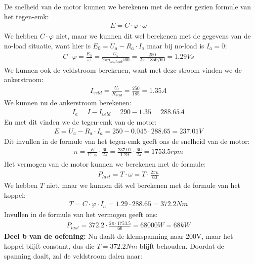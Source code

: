 \begin{oefenblok}
De snelheid van de motor kunnen we berekenen met de eerder gezien formule van het
tegen-emk:
\begin{align*}
    E = C \cdot \varphi \cdot \omega
\end{align*}
We hebben $C \cdot \varphi$ niet, maar we kunnen dit wel berekenen met de gegevens van de
no-load situatie, want hier is $E_0 = U_a - R_a \cdot I_a$ maar bij no-load is $I_a = 0$:
\begin{align*}
    C \cdot \varphi = \frac{E_0}{\omega} = \frac{U_a}{2 \pi n_{no,load}/60} = \frac{250}{2 \pi \cdot 1850/60} = 1.29 Vs
\end{align*}
We kunnen ook de veldstroom berekenen, want met deze stroom vinden we de ankerstroom:
\begin{align*}
    I_{veld} = \frac{U_a}{R_{veld}} = \frac{250}{185} = 1.35 A
\end{align*}
We kunnen nu de ankerstroom berekenen:
\begin{align*}
    I_a = I - I_{veld} = 290 - 1.35 = 288.65 A
\end{align*}
En met dit vinden we de tegen-emk van de motor:
\begin{align*}
    E = U_a - R_a \cdot I_a = 250 - 0.045 \cdot 288.65 = 237.01 V
\end{align*}
Dit invullen in de formule van het tegen-emk geeft ons de snelheid van de motor:
\begin{align*}
    n = \frac{E}{C \cdot \varphi} \cdot \frac{60}{2 \pi} = \frac{237.01}{1.29} \cdot \frac{60}{2 \pi} = 1753.5 rpm
\end{align*}
Het vermogen van de motor kunnen we berekenen met de formule:
\begin{align*}
    P_{last} = T \cdot \omega = T \cdot \frac{2 \pi n}{60}
\end{align*}
We hebben $T$ niet, maar we kunnen dit wel berekenen met de formule van het koppel:
\begin{align*}
    T = C \cdot \varphi \cdot I_a = 1.29 \cdot 288.65 = 372.2 Nm
\end{align*}
Invullen in de formule van het vermogen geeft ons:
\begin{align*}
    P_{last} = 372.2 \cdot \frac{2 \pi \cdot 1753.5}{60} = 68000 W = 68 kW
\end{align*}
\textbf{Deel b van de oefening:}
\newline
Nu daalt de klemspanning naar 200V, maar het koppel blijft constant, dus die
$T = 372.2 Nm$ blijft behouden.
Doordat de spanning daalt, zal de veldstroom dalen naar:
\begin{align*}

\end{align*}
\end{oefenblok}

